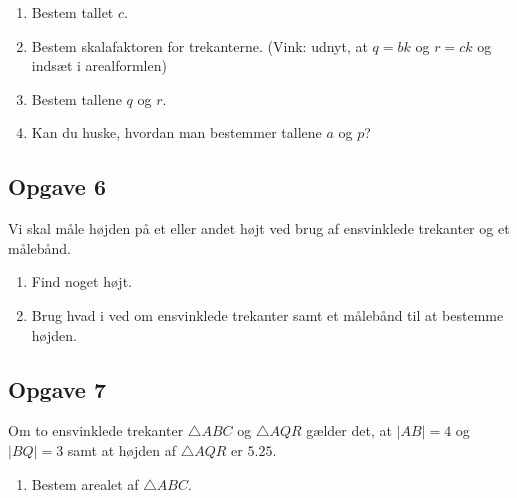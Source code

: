 \begin{enumerate}[label=\roman*)]
	\item Bestem tallet $c$.
	\item Bestem skalafaktoren for trekanterne. (Vink: udnyt, at $q = bk$ og $r = ck$ og indsæt i arealformlen)
	\item Bestem tallene $q$ og $r$. 
	\item Kan du huske, hvordan man bestemmer tallene $a$ og $p$?
\end{enumerate}

\subsection*{Opgave 6}

Vi skal måle højden på et eller andet højt ved brug af ensvinklede trekanter og et målebånd. 
\begin{enumerate}[label=\roman*)]
	\item Find noget højt. 
	\item Brug hvad i ved om ensvinklede trekanter samt et målebånd til at bestemme højden. 
\end{enumerate}

\subsection*{Opgave 7}
Om to ensvinklede trekanter $\triangle ABC$ og $\triangle AQR$ gælder det, at $|AB| = 4$ og $|BQ| = 3$ samt at højden af $\triangle AQR$ er $5.25$. 
\begin{center}
\end{center}
\begin{enumerate}[label=\roman*)]
	\item Bestem arealet af $\triangle ABC$.
\end{enumerate}
